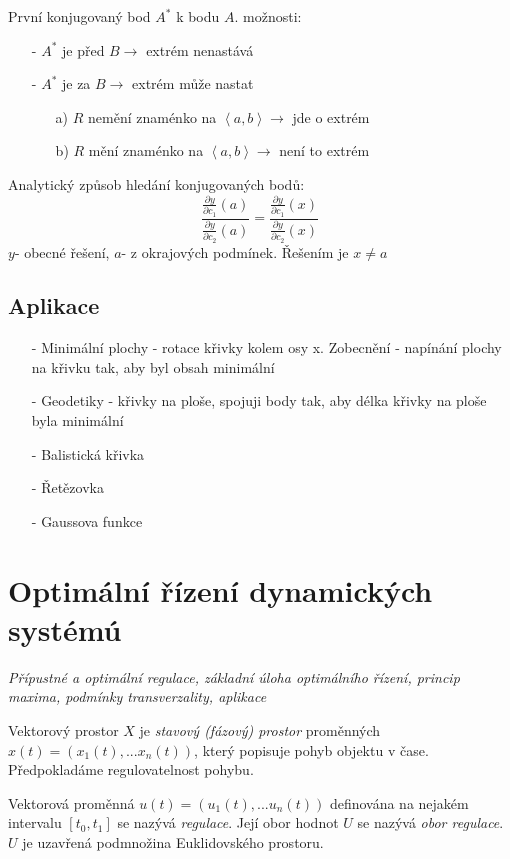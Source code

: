 {První konjugovaný bod $A^{*}$ k bodu $A$.
 možnosti:
  \begin{enumerate}
\item[-] $A^{*}$ je před $B \rightarrow$ extrém nenastává
\item[-] $A^{*}$ je za $B \rightarrow$ extrém může nastat \begin{enumerate}
\item[a)] $R$ nemění znaménko na $\left \langle a,b \right \rangle \rightarrow$ jde o extrém
\item[b)] $R$ mění znaménko na $\left \langle a,b \right \rangle \rightarrow$ není to extrém 
\end{enumerate}

\end{enumerate}

Analytický způsob hledání konjugovaných bodů:
$$ \frac{\frac{\partial y}{\partial c_{1}}(a)}{\frac{\partial y}{\partial c_{2}}(a)}=\frac{\frac{\partial y}{\partial c_{1}}(x)}{\frac{\partial y}{\partial c_{2}}(x)}$$
$y$- obecné řešení, $a$- z okrajových podmínek. Řešením je $x\neq a$

\subsection{Aplikace}
\begin{enumerate}
\item[-]Minimální plochy - rotace křivky kolem osy x. Zobecnění - napínání plochy na křivku tak, aby byl obsah minimální
\item[-]Geodetiky - křivky na ploše, spojuji body tak, aby délka křivky na ploše byla minimální
\item[-]Balistická křivka
\item[-]Řetězovka
\item[-]Gaussova funkce
\end{enumerate}

\section{Optimální řízení dynamických systémú}

\textit{Přípustné a optimální regulace, základní úloha optimálního řízení, princip maxima, podmínky transverzality, aplikace}\\

\begin{definition}
Vektorový prostor $X$ je \textit{stavový (fázový) prostor} proměnných $x(t)=(x_1(t),...x_n(t))$, který popisuje pohyb objektu v čase. Předpokladáme regulovatelnost pohybu.
\end{definition}
\begin{definition}
Vektorová proměnná $u(t)=(u_1(t),...u_n(t))$ definována na nejakém intervalu $[t_0,t_1]$ se nazývá \textit{regulace}. Její obor hodnot $U$ se nazývá \textit{obor regulace}. $U$ je uzavřená podmnožina Euklidovského prostoru.
\end{definition}

}
